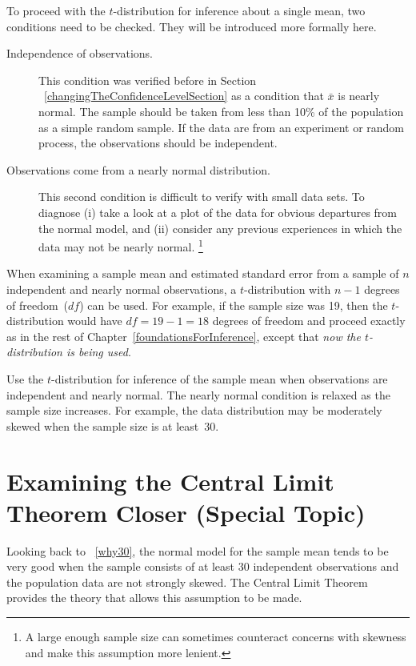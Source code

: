 To proceed with the $t$-distribution for inference about a single mean, two conditions need to be checked. They will be introduced more formally here.
\begin{description}
\item[Independence of observations.] This condition was verified before in Section ~\ref{changingTheConfidenceLevelSection} as a condition that $\bar{x}$ is nearly normal. The sample should be taken from less than 10\% of the population as a simple random sample. If the data are from an experiment or random process, the observations should be independent. 
\item[Observations come from a nearly normal distribution.] This second condition is difficult to verify with small data sets. To diagnose (i) take a look at a plot of the data for obvious departures from the normal model, and (ii) consider any previous experiences in which the data may not be nearly normal. \footnote{A large enough sample size can sometimes counteract concerns with skewness and make this assumption more lenient.}
\end{description}
When examining a sample mean and estimated standard error from a sample of $n$ independent and nearly normal observations, a $t$-distribution with $n-1$ degrees of freedom~($df$) can be used. For example, if the sample size was 19, then the $t$-distribution would have $df=19-1=18$ degrees of freedom and proceed exactly as in the rest of Chapter~\ref{foundationsForInference}, except that \emph{now the $t$-distribution is being used}.

\begin{tipBox}{
Use the $t$-distribution for inference of the sample mean when observations are independent and nearly normal. The nearly normal condition is relaxed as the sample size increases. For example, the data distribution may be moderately skewed when the sample size is at least~30.}
\end{tipBox}

\section{Examining the Central Limit Theorem Closer (Special Topic)}
\label{cltSection}


Looking back to ~\ref{why30}, the normal model for the sample mean tends to be very good when the sample consists of at least 30 independent observations and the population data are not strongly skewed. The Central Limit Theorem provides the theory that allows this assumption to be made.

